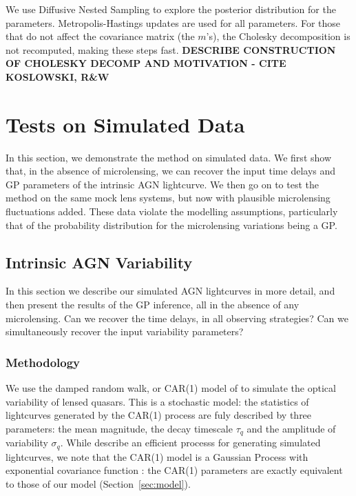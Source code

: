 \documentclass[useAMS,usenatbib, a4paper]{mn2e} \usepackage{natbib}
\begin{document}
We use Diffusive Nested Sampling \citep{dnest} to explore the posterior
distribution for the parameters. Metropolis-Hastings updates are used for all
parameters. For those that do not affect the covariance matrix (the $m$'s),
the Cholesky decomposition is not recomputed, making these steps fast. {\bf
DESCRIBE CONSTRUCTION OF CHOLESKY DECOMP AND MOTIVATION - CITE KOSLOWSKI,
R\&W}



\section{Tests on Simulated Data}\label{simdata}

In this section, we demonstrate the method on simulated data. We first show
that, in the absence of microlensing, we can recover the input time delays and
GP parameters of the intrinsic AGN lightcurve. We then go on to test the
method on the same mock lens systems, but now with plausible microlensing
fluctuations added. These data violate the modelling assumptions, particularly
that of the probability distribution for the microlensing variations being a
GP. 


\subsection{Intrinsic AGN Variability}

In this section we describe our simulated AGN lightcurves in more detail, and
then present the results of the GP inference, all in the absence of any
microlensing. Can we recover the time delays, in all observing strategies? Can
we simultaneously recover the input variability parameters?

\subsubsection{Methodology}

We use the damped random walk, or CAR(1) model of \citet{Kel++09} to simulate
the optical variability of lensed quasars. This is a stochastic model: the
statistics of lightcurves generated by the CAR(1) process are fuly described
by three parameters: the mean magnitude, the decay timescale $\tau_q$ and the
amplitude of  variability $\sigma_q$. While \citeauthor{Kel++09} describe an
efficient processs for generating simulated lightcurves,  we note that the
CAR(1) model is a Gaussian Process with exponential covariance function
\citep{Zu++10}: the CAR(1) parameters are exactly equivalent to those of our
model (Section~\ref{sec:model}). 
\end{document}
